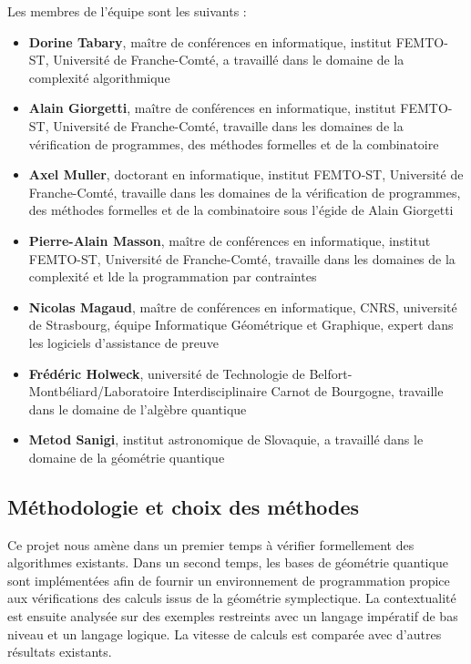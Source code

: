 \documentclass[10pt, a4paper, french]{article}
\begin{document}
Les membres de l'équipe sont les suivants :
\begin{itemize}
    \item \textbf{Dorine Tabary}, maître de conférences en informatique, institut FEMTO-ST, Université de Franche-Comté, a travaillé dans le domaine de la complexité algorithmique
    \item \textbf{Alain Giorgetti}, maître de conférences en informatique, institut FEMTO-ST, Université de Franche-Comté, travaille dans les domaines de la vérification de programmes, des méthodes formelles et de la combinatoire
    \item \textbf{Axel Muller}, doctorant en informatique, institut FEMTO-ST, Université de Franche-Comté, travaille dans les domaines de la vérification de programmes, des méthodes formelles et de la combinatoire sous l'égide de Alain Giorgetti
    \item \textbf{Pierre-Alain Masson}, maître de conférences en informatique, institut FEMTO-ST, Université de Franche-Comté, travaille dans les domaines de la complexité et lde la programmation par contraintes
    \item \textbf{Nicolas Magaud}, maître de conférences en informatique, CNRS, université de Strasbourg, équipe Informatique Géométrique et Graphique, expert dans les logiciels d'assistance de preuve
    \item \textbf{Frédéric Holweck}, université de Technologie de Belfort-Montbéliard/Laboratoire Interdisciplinaire Carnot de Bourgogne, travaille dans le domaine de l'algèbre quantique
    \item \textbf{Metod Sanigi}, institut astronomique de Slovaquie, a travaillé dans le domaine de la géométrie quantique
\end{itemize}




\subsection{Méthodologie et choix des méthodes}

Ce projet nous amène dans un premier temps à vérifier formellement des algorithmes existants.
Dans un second temps, les bases de géométrie quantique sont implémentées afin de fournir un environnement de programmation propice aux vérifications des calculs issus de la géométrie symplectique.
La contextualité est ensuite analysée sur des exemples restreints avec un langage impératif de bas niveau et un langage logique. La vitesse de calculs est comparée avec d'autres résultats existants.
\end{document}
